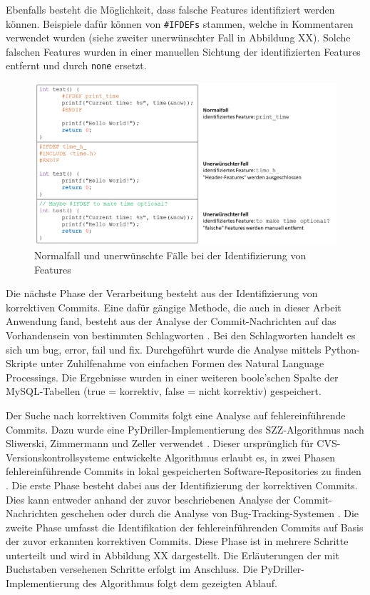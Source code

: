 Ebenfalls besteht die Möglichkeit, dass \glqq falsche\grqq{} Features identifiziert werden können. Beispiele dafür können von \texttt{\#IFDEFs} stammen, welche in Kommentaren verwendet wurden (siehe zweiter unerwünschter Fall in Abbildung XX). Solche falschen Features wurden in einer manuellen Sichtung der identifizierten Features entfernt und durch \texttt{none} ersetzt.

\begin{figure}[]
    \centering
    \includegraphics[width=\textwidth]{images/Features}
    \caption{Normalfall und unerwünschte Fälle bei der Identifizierung von Features\label{fig:feat}}
\end{figure}

Die nächste Phase der Verarbeitung besteht aus der Identifizierung von korrektiven Commits. Eine dafür gängige Methode, die auch in dieser Arbeit Anwendung fand, besteht aus der Analyse der Commit-Nachrichten auf das Vorhandensein von bestimmten Schlagworten \cite{Zimmermann2007}. Bei den Schlagworten handelt es sich um \glqq bug\grqq, \glqq error\grqq, \glqq fail\grqq{} und \glqq fix\grqq. Durchgeführt wurde die Analyse mittels Python-Skripte unter Zuhilfenahme von einfachen Formen des Natural Language Processings. Die Ergebnisse wurden in einer weiteren boole'schen Spalte der MySQL-Tabellen (true = korrektiv, false = nicht korrektiv) gespeichert.

\label{szz-def}
Der Suche nach korrektiven Commits folgt eine Analyse auf fehlereinführende Commits. Dazu wurde eine PyDriller-Implementierung des SZZ-Algorithmus nach Sliwerski, Zimmermann und Zeller verwendet \cite{Sliwerski2005}. Dieser ursprünglich für CVS-Versionskontrollsysteme entwickelte Algorithmus erlaubt es, in zwei Phasen fehlereinführende Commits in lokal gespeicherten Software-Repositories zu finden \cite{Borg2019}. Die erste Phase besteht dabei aus der Identifizierung der korrektiven Commits. Dies kann entweder anhand der zuvor beschriebenen Analyse der Commit-Nachrichten geschehen oder durch die Analyse von Bug-Tracking-Systemen \cite{Borg2019}. Die zweite Phase umfasst die Identifikation der fehlereinführenden Commits auf Basis der zuvor erkannten korrektiven Commits. Diese Phase ist in mehrere Schritte unterteilt und wird in Abbildung XX dargestellt. Die Erläuterungen der mit Buchstaben versehenen Schritte erfolgt im Anschluss. Die PyDriller-Implementierung des Algorithmus folgt dem gezeigten Ablauf.

